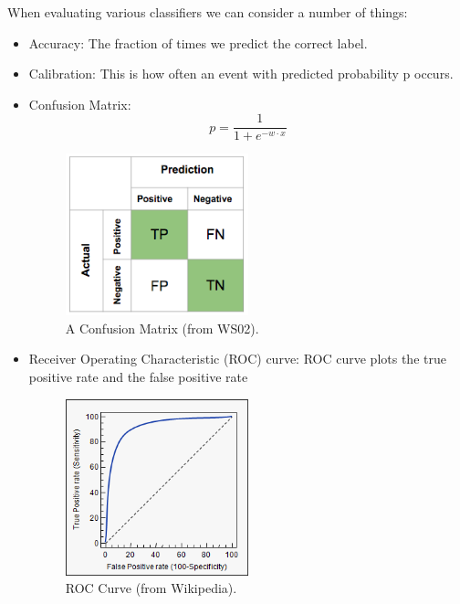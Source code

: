 When evaluating various classifiers we can consider a number of things:
\begin{itemize}
\item Accuracy: The fraction of times we predict the correct label.
\item Calibration: This is how often an event with predicted probability p occurs.
\item Confusion Matrix:
\begin{equation}
p = \frac{1}{1+e^{-w\cdot x}}
\end{equation}
\begin{figure}[ht]
  \begin{center}
    \includegraphics[width=0.5\textwidth]{figures/pic2.png}
    \caption{
      A Confusion Matrix (from WS02). 
      }
    \label{fig:example_figure2}
  \end{center}
\end{figure}

\item Receiver Operating Characteristic (ROC) curve: ROC curve plots the true positive rate and the false positive rate
\begin{figure}[ht]
  \begin{center}
    \includegraphics[width=0.5\textwidth]{figures/pic3.png}
    \caption{
      ROC Curve (from Wikipedia). 
      }
    \label{fig:example_figure3}
  \end{center}
\end{figure}
\end{itemize}




